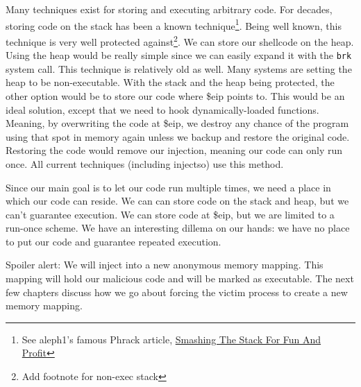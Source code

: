 Many techniques exist for storing and executing arbitrary code. For decades, storing
code on the stack has been a known technique\footnote{See aleph1's famous Phrack article,
\href{http://www.phrack.com/issues.html?issue=49&id=14&mode=txt}{Smashing The Stack For Fun And Profit}}.
Being well known, this technique is very well protected against\footnote{Add footnote for non-exec stack}.
We can store our shellcode on the heap. Using the heap would be really simple since
we can easily expand it with the \texttt{brk} system call. This technique is
relatively old as well. Many systems are setting the heap to be non-executable.
With the stack and the heap being protected, the other option would be to store our
code where \$eip points to. This would be an ideal solution, except that we need
to hook dynamically-loaded functions. Meaning, by overwriting the code at \$eip, we
destroy any chance of the program using that spot in memory again unless we backup
and restore the original code. Restoring the code would remove our injection,
meaning our code can only run once. All current techniques (including injectso) use
this method.

Since our main goal is to let our code run multiple times, we need a place in which
our code can reside. We can can store code on the stack and heap, but we can't
guarantee execution. We can store code at \$eip, but we are limited to a
run-once scheme. We have an interesting dillema on our hands: we have no place to
put our code and guarantee repeated execution.

Spoiler alert: We will inject into a new anonymous memory mapping. This mapping will
hold our malicious code and will be marked as executable. The next few chapters
discuss how we go about forcing the victim process to create a new memory mapping.
